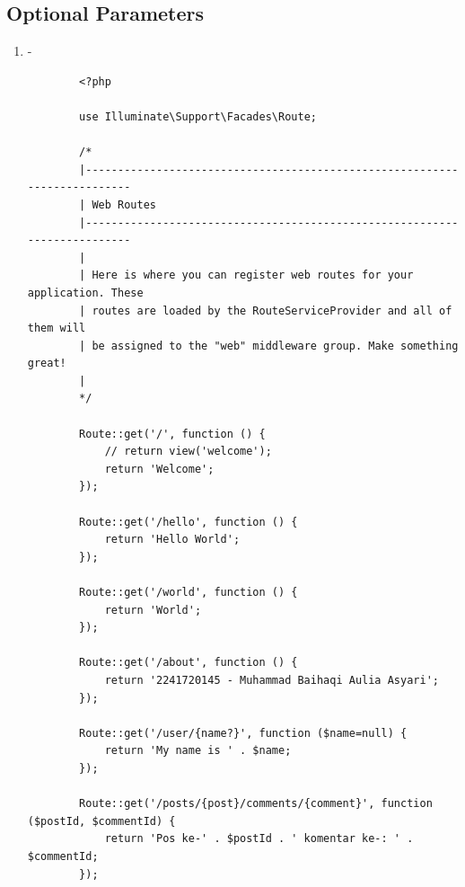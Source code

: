\documentclass[12pt,titlepage]{article}
\begin{document}
\subsection{Optional Parameters}
\begin{enumerate}[label=\alph*.]
    \item -
    \begin{verbatim}
        <?php

        use Illuminate\Support\Facades\Route;
        
        /*
        |--------------------------------------------------------------------------
        | Web Routes
        |--------------------------------------------------------------------------
        |
        | Here is where you can register web routes for your application. These
        | routes are loaded by the RouteServiceProvider and all of them will
        | be assigned to the "web" middleware group. Make something great!
        |
        */
        
        Route::get('/', function () {
            // return view('welcome');
            return 'Welcome';
        });
        
        Route::get('/hello', function () {
            return 'Hello World';
        });
        
        Route::get('/world', function () {
            return 'World';
        }); 
        
        Route::get('/about', function () {
            return '2241720145 - Muhammad Baihaqi Aulia Asyari';
        }); 
        
        Route::get('/user/{name?}', function ($name=null) {
            return 'My name is ' . $name;
        }); 
        
        Route::get('/posts/{post}/comments/{comment}', function ($postId, $commentId) {
            return 'Pos ke-' . $postId . ' komentar ke-: ' . $commentId;
        });
        

\end{verbatim}
\end{enumerate}
\end{document}
